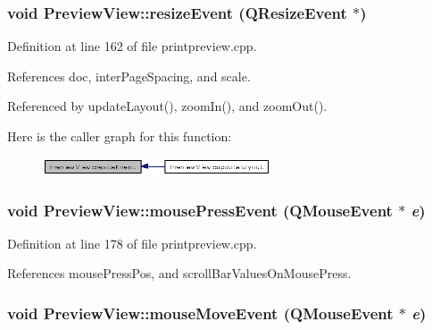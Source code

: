 \subsubsection{\setlength{\rightskip}{0pt plus 5cm}void Preview\-View::resize\-Event (QResize\-Event $\ast$)\hspace{0.3cm}{\tt  [protected, virtual]}}\label{classPreviewView_fb08458c6edd29a61054b1f38cfafeb2}




Definition at line 162 of file printpreview.cpp.

References doc, inter\-Page\-Spacing, and scale.

Referenced by update\-Layout(), zoom\-In(), and zoom\-Out().

Here is the caller graph for this function:\begin{figure}[H]
\begin{center}
\leavevmode
\includegraphics[width=191pt]{classPreviewView_fb08458c6edd29a61054b1f38cfafeb2_icgraph}
\end{center}
\end{figure}
\subsubsection{\setlength{\rightskip}{0pt plus 5cm}void Preview\-View::mouse\-Press\-Event (QMouse\-Event $\ast$ {\em e})\hspace{0.3cm}{\tt  [protected, virtual]}}\label{classPreviewView_5b40b21ddb841b86fe940c6e8e1c3d72}




Definition at line 178 of file printpreview.cpp.

References mouse\-Press\-Pos, and scroll\-Bar\-Values\-On\-Mouse\-Press.
\subsubsection{\setlength{\rightskip}{0pt plus 5cm}void Preview\-View::mouse\-Move\-Event (QMouse\-Event $\ast$ {\em e})\hspace{0.3cm}{\tt  [protected, virtual]}}\label{classPreviewView_e5f620898cf4f29bcfb9fc50ea267271}




